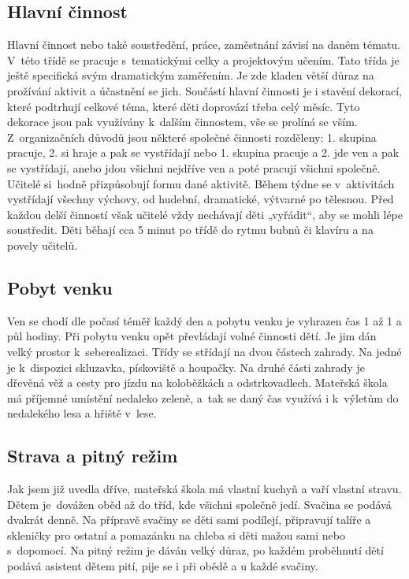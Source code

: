 		\subsection{Hlavní činnost}
			Hlavní činnost nebo také soustředění, práce, zaměstnání závisí na daném tématu. V této třídě se pracuje s tematickými celky a projektovým učením. Tato třída je ještě specifická svým dramatickým zaměřením. Je zde kladen větší důraz na prožívání aktivit a účastnění se jich. Součástí hlavní činnosti je i stavění dekorací, které podtrhují celkové téma, které děti doprovází třeba celý měsíc. Tyto dekorace jsou pak využívány k dalším činnostem, vše se prolíná se vším. Z organizačních důvodů jsou některé společné činnosti rozděleny: 1. skupina pracuje, 2. si hraje a pak se vystřídají nebo 1. skupina pracuje a 2. jde ven a pak se vystřídají, anebo jdou všichni nejdříve ven a poté pracují všichni společně. Učitelé si hodně přizpůsobují formu dané aktivitě. Během týdne se v aktivitách vystřídají všechny výchovy, od hudební, dramatické, výtvarné po tělesnou. Před každou delší činností však učitelé vždy nechávají děti „vyřádit“, aby se mohli lépe soustředit. Děti běhají cca 5 minut po třídě do rytmu bubnů či klavíru a na povely učitelů. 

		\subsection{Pobyt venku}
			Ven se chodí dle počasí téměř každý den a pobytu venku je vyhrazen čas 1 až 1 a půl hodiny. Při pobytu venku opět převládají volné činnosti dětí. Je jim dán velký prostor k seberealizaci. Třídy se střídají na dvou částech zahrady. Na jedné je k dispozici skluzavka, pískoviště a houpačky. Na druhé části zahrady je dřevěná věž a cesty pro jízdu na koloběžkách a odstrkovadlech. Mateřská škola má příjemné umístění nedaleko zeleně, a tak se daný čas využívá i k výletům do nedalekého lesa a hřiště v lese.

		\subsection{Strava a pitný režim}
			Jak jsem již uvedla dříve, mateřská škola má vlastní kuchyň a vaří vlastní stravu. Dětem je dovážen oběd až do tříd, kde všichni společně jedí. 
			Svačina se podává dvakrát denně. Na přípravě svačiny se děti sami podílejí, připravují talíře a skleničky pro ostatní a pomazánku na chleba si děti mažou sami nebo s dopomocí. 
			Na pitný režim je dáván velký důraz, po každém proběhnutí dětí podává asistent dětem pití, pije se i při obědě a u každé svačiny. 

